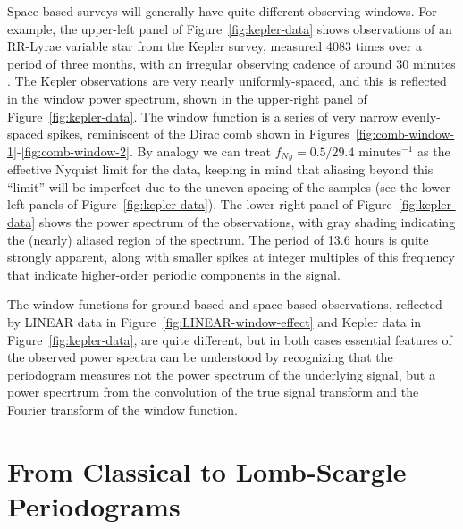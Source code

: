 \documentclass[preprint]{aastex}
\newcommand{\fig}[1]{Figure~\ref{fig:#1}}
\newcommand{\figs}[2]{Figures~\ref{fig:#1}-\ref{fig:#2}}
\newcommand{\sectlabel}[1]{\label{sect:#1}}
\begin{document}
Space-based surveys will generally have quite different observing windows.
For example, the upper-left panel of \fig{kepler-data}
shows observations of an RR-Lyrae variable star from the Kepler survey,
measured 4083 times over a period of three months,
with an irregular observing cadence of around 30 minutes
 \citep[For deeper discussion of these observations, see][]{Kolenberg2010}.
The Kepler observations are very nearly uniformly-spaced, and this is reflected
in the window power spectrum, shown in the upper-right panel of
\fig{kepler-data}.
The window function is a series of very narrow evenly-spaced spikes,
reminiscent of the Dirac comb shown in \figs{comb-window-1}{comb-window-2}.
By analogy we can treat $f_{Ny} = 0.5/29.4$ minutes$^{-1}$ as the
effective Nyquist limit for the data, keeping in mind that aliasing beyond this
``limit'' will be imperfect due to the uneven spacing of the samples
(see the lower-left panels of \fig{kepler-data}).
The lower-right panel of \fig{kepler-data} shows the power spectrum of the
observations, with gray shading indicating the (nearly) aliased region
of the spectrum.
The period of 13.6 hours is quite strongly apparent, along with smaller spikes
at integer multiples of this frequency that indicate higher-order periodic
components in the signal.

The window functions for ground-based and space-based observations, reflected
by LINEAR data in \fig{LINEAR-window-effect} and Kepler data in
\fig{kepler-data}, are quite different, but in both cases essential features
of the observed power spectra can be understood by recognizing that the
periodogram measures
not the power spectrum of the underlying signal, but a power specrtrum from
the convolution of the true signal transform and the Fourier transform of
the window function.


\section{From Classical to Lomb-Scargle Periodograms}
\sectlabel{schuster-to-lomb-scargle}
\end{document}

